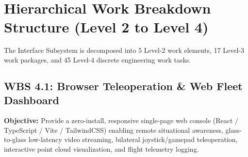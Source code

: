 \documentclass[10pt,a4paper]{article}
\begin{document}
\section{Hierarchical Work Breakdown Structure (Level 2 to Level 4)}
\label{sec:wbs_decomposition}

The Interface Subsystem is decomposed into 5 Level-2 work elements, 17 Level-3 work packages, and 45 Level-4 discrete engineering work tasks.

\subsection{WBS 4.1: Browser Teleoperation \& Web Fleet Dashboard}
\textbf{Objective:} Provide a zero-install, responsive single-page web console (React / TypeScript / Vite / TailwindCSS) enabling remote situational awareness, glass-to-glass low-latency video streaming, bilateral joystick/gamepad teleoperation, interactive point cloud visualization, and flight telemetry logging.
\end{document}
